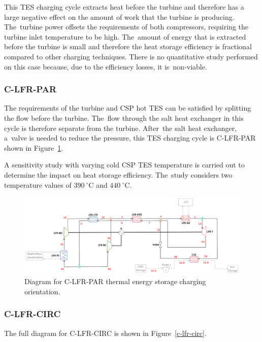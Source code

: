 \documentclass[sustainability,article,accept,moreauthors,pdftex]{Definitions/mdpi}
\begin{document}
\begin{paracol}{2}
\switchcolumn

This TES charging cycle extracts heat before the turbine and therefore has a large negative effect on the amount of work that the turbine is producing. The~turbine power offsets the requirements of both compressors, requiring the turbine inlet temperature to be high. The~amount of energy that is extracted before the turbine is small and therefore the heat storage efficiency is fractional compared to other charging techniques. There is no quantitative study performed on this case because, due to the efficiency losses, it is~non-viable. 

\subsubsection{C-LFR-PAR} 

The requirements of the turbine and CSP hot TES can be satisfied by splitting the flow before the turbine. The~flow through the salt heat exchanger in this cycle is therefore separate from the turbine. After~the salt heat exchanger, a~valve is needed to reduce the pressure, this TES charging cycle is C-LFR-PAR shown in Figure~\ref{c-lfr-par}.

A sensitivity study with varying cold CSP TES temperature is carried out to determine the impact on heat storage efficiency. The~study considers two temperature values of $390~^{\circ}$C and $440~^{\circ}$C.

\clearpage
\end{paracol}
\begin{figure}[H]
    \widefigure
    \includegraphics[width=\linewidth]{Definitions/c-lfr-par.pdf}
    \caption{Diagram for C-LFR-PAR thermal energy storage charging orientation\label{c-lfr-par}.}
\end{figure}
\begin{paracol}{2}
\switchcolumn

\vspace{-6pt}
\subsubsection{C-LFR-CIRC} 

The full diagram for C-LFR-CIRC is shown in Figure~\ref{c-lfr-circ}.
\end{paracol}
\end{document}
